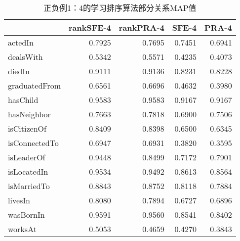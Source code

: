 \begin{table}[htbp]
  \centering
  \caption{正负例1：4的学习排序算法部分关系MAP值}
    \begin{tabular}{|l|r|r|r|r|}
    \hline
          & \multicolumn{1}{l|}{rankSFE-4} & \multicolumn{1}{l|}{rankPRA-4} & \multicolumn{1}{l|}{SFE-4} & \multicolumn{1}{l|}{PRA-4} \bigstrut\\
    \hline
    actedIn                                                     & 0.7925  & 0.7695  & 0.7451  & 0.6941  \bigstrut\\
    \hline
    dealsWith                                                   & 0.5342  & 0.5571  & 0.4235  & 0.4073  \bigstrut\\
    \hline
    diedIn                                                      & 0.9111  & 0.9136  & 0.8231  & 0.8228  \bigstrut\\
    \hline
    graduatedFrom                                               & 0.6561  & 0.6696  & 0.4632  & 0.3980  \bigstrut\\
    \hline
    hasChild                                                    & 0.9583  & 0.9583  & 0.9167  & 0.9167  \bigstrut\\
    \hline
    hasNeighbor                                                 & 0.7663  & 0.7818  & 0.6900  & 0.7506  \bigstrut\\
    \hline
    isCitizenOf                                                 & 0.8409  & 0.8398  & 0.6500  & 0.6345  \bigstrut\\
    \hline
    isConnectedTo                                               & 0.6947  & 0.6931  & 0.3820  & 0.3595  \bigstrut\\
    \hline
    isLeaderOf                                                  & 0.9448  & 0.8499  & 0.7172  & 0.7901  \bigstrut\\
    \hline
    isLocatedIn                                                 & 0.9534  & 0.9492  & 0.8613  & 0.8564  \bigstrut\\
    \hline
    isMarriedTo                                                 & 0.8843  & 0.8752  & 0.8118  & 0.7884  \bigstrut\\
    \hline
    livesIn                                                     & 0.8080  & 0.7894  & 0.6727  & 0.6896  \bigstrut\\
    \hline
    wasBornIn                                                   & 0.9591  & 0.9560  & 0.8541  & 0.8402  \bigstrut\\
    \hline
    worksAt                                                     & 0.5053  & 0.4659  & 0.4270  & 0.3843  \bigstrut\\
    \hline
    \end{tabular}%
  \label{tab:kbc-yago-rank10}%
\end{table}%



